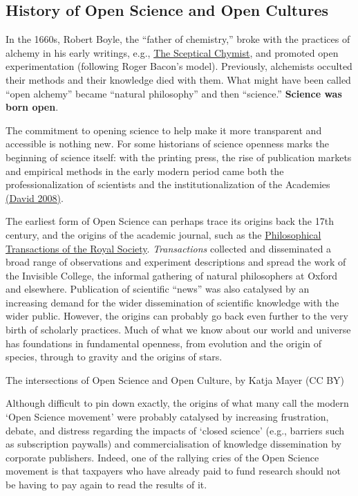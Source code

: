 \documentclass[]{book}
\begin{document}
\hypertarget{history-of-open-science-and-open-cultures}{%
\subsection{History of Open Science and Open Cultures }\label{history-of-open-science-and-open-cultures}}

In the 1660s, Robert Boyle, the ``father of chemistry,'' broke with the practices of alchemy in his early writings, e.g., \href{https://en.wikipedia.org/wiki/The_Sceptical_Chymist}{The Sceptical Chymist}, and promoted open experimentation (following Roger Bacon's model). Previously, alchemists occulted their methods and their knowledge died with them. What might have been called ``open alchemy'' became ``natural philosophy'' and then ``science.'' \textbf{Science was born open}.

The commitment to opening science to help make it more transparent and accessible is nothing new. For some historians of science openness marks the beginning of science itself: with the printing press, the rise of publication markets and empirical methods in the early modern period came both the professionalization of scientists and the institutionalization of the Academies \href{https://ssrn.com/abstract=2209188}{(David 2008)}.

The earliest form of Open Science can perhaps trace its origins back the 17th century, and the origins of the academic journal, such as the \href{https://en.wikipedia.org/wiki/Philosophical_Transactions_of_the_Royal_Society}{Philosophical Transactions of the Royal Society}. \emph{Transactions} collected and disseminated a broad range of observations and experiment descriptions and spread the work of the Invisible College, the informal gathering of natural philosophers at Oxford and elsewhere. Publication of scientific ``news'' was also catalysed by an increasing demand for the wider dissemination of scientific knowledge with the wider public. However, the origins can probably go back even further to the very birth of scholarly practices. Much of what we know about our world and universe has foundations in fundamental openness, from evolution and the origin of species, through to gravity and the origins of stars.

The intersections of Open Science and Open Culture, by Katja Mayer (CC BY)

Although difficult to pin down exactly, the origins of what many call the modern `Open Science movement' were probably catalysed by increasing frustration, debate, and distress regarding the impacts of `closed science' (e.g., barriers such as subscription paywalls) and commercialisation of knowledge dissemination by corporate publishers. Indeed, one of the rallying cries of the Open Science movement is that taxpayers who have already paid to fund research should not be having to pay again to read the results of it.
\end{document}
